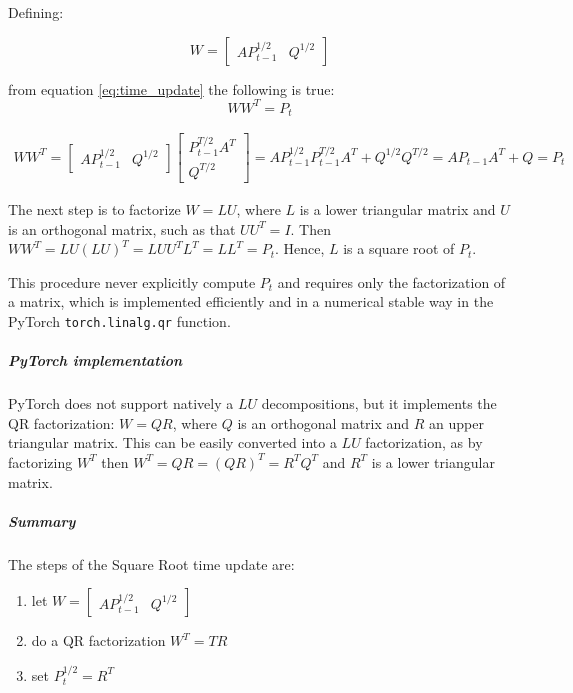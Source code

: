 \documentclass{article}
\begin{document}
Defining:

\begin{equation}
    W = \begin{bmatrix}AP_{t-1}^{1/2} & Q^{1/2}\end{bmatrix}
\end{equation}

from equation \ref{eq:time_update} the following is true:
\begin{equation}\label{time_update_SR_mult}
WW^T = P_t 
\end{equation}

\begin{multline}
  WW^T =  \begin{bmatrix}AP_{t-1}^{1/2} & Q^{1/2}\end{bmatrix}\begin{bmatrix}P_{t-1}^{T/2}A^T \\ Q^{T/2}\end{bmatrix}
  = AP_{t-1}^{1/2}P_{t-1}^{T/2}A^T + Q^{1/2}Q^{T/2} = AP_{t-1}A^T + Q = P_t
\end{multline}

The next step is to factorize  $W=LU$, where $L$ is a lower triangular matrix and $U$ is an orthogonal matrix, such as that $UU^T = I$. Then $WW^T = LU(LU)^T = LUU^TL^T = LL^T=P_t$. Hence, $L$ is a square root of $P_t$.

This procedure never explicitly compute $P_t$ and requires only the factorization of a matrix, which is implemented efficiently and in a numerical stable way in the PyTorch \verb|torch.linalg.qr| function. 

\subparagraph{PyTorch implementation} PyTorch does not support natively a $LU$ decompositions, but it implements the QR factorization: $W=QR$, where $Q$ is an orthogonal matrix and $R$ an upper triangular matrix. This can be easily converted into a $LU$ factorization, as by factorizing $W^T$ then $W^T=QR=(QR)^T=R^TQ^T$ and $R^T$ is a lower triangular matrix.

\subparagraph{Summary} The steps of the Square Root time update are:

\begin{enumerate}
    \item let  $W = \begin{bmatrix}AP_{t-1}^{1/2} & Q^{1/2}\end{bmatrix}$
    \item do a QR factorization $W^T=TR$
    \item set $P_t^{1/2} = R^T$
\end{enumerate}
\end{document}
